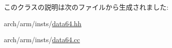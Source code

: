 このクラスの説明は次のファイルから生成されました:\begin{DoxyCompactItemize}
\item 
arch/arm/insts/\hyperlink{data64_8hh}{data64.hh}\item 
arch/arm/insts/\hyperlink{data64_8cc}{data64.cc}\end{DoxyCompactItemize}
